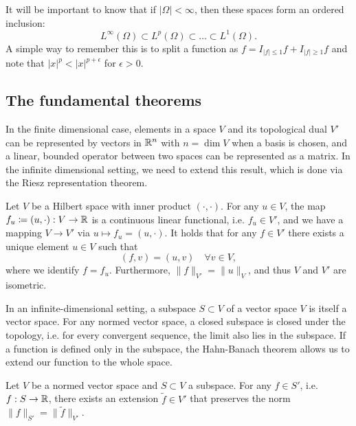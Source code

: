 It will be important to know that if $|\Omega|<\infty$, then these spaces form an ordered inclusion: 
\begin{equation}
    L^\infty(\Omega) \subset L^p(\Omega) \subset \dots \subset L^1(\Omega).
\end{equation}
A simple way to remember this is to split a function as $f = I_{|f|\leq 1}f + I_{|f|\geq 1}f$ and note that $|x|^p < |x|^{p+\epsilon}$ for $\epsilon > 0$. 

\subsection{The fundamental theorems}
In the finite dimensional case, elements in a space $V$ and its topological dual $V'$ can be represented by vectors in $\mathbb{R}^n$ with $n=\dim V$ when a basis is chosen, and a linear, bounded operator between two spaces can be represented as a matrix. In the infinite dimensional setting, we need to extend this result, which is done via the Riesz representation theorem. 

\begin{theorem}\label{thm:riesz-representation}
    Let $V$ be a Hilbert space with inner product $(\cdot,\cdot)$. For any $u\in V$, the map $f_u\coloneqq (u,\cdot):V\to \mathbb{R}$ is a continuous linear functional, i.e. $f_u\in V'$, and we have a mapping $V\to V'$ via $u\mapsto f_u=(u,\cdot)$. It holds that for any $f\in V'$ there exists a unique element $u\in V$ such that 
    \begin{equation}
        (f,v) = (u,v)\quad \forall v\in V,
    \end{equation}
    where we identify $f=f_u$. Furthermore, $\|f\|_{V'} = \|u\|_V$, and thus $V$ and $V'$ are isometric.
\end{theorem}

In an infinite-dimensional setting, a subspace $S\subset V$ of a vector space $V$ is itself a vector space. For any normed vector space, a closed subspace is closed under the topology, i.e. for every convergent sequence, the limit also lies in the subspace. If a function is defined only in the subspace, the Hahn-Banach theorem allows us to extend our function to the whole space. 
\begin{theorem}\label{thm:hahn-banach}
    Let $V$ be a normed vector space and $S\subset V$ a subspace. For any $f\in S'$, i.e. $f:S\to\mathbb{R}$, there exists an extension $\tilde{f}\in V'$ that preserves the norm $\|f\|_{S'} = \|\tilde{f}\|_{V'}$.
\end{theorem}

